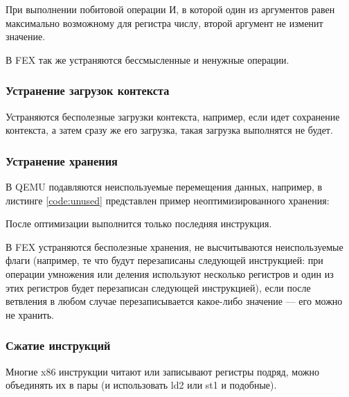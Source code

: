 При выполнении побитовой операции И, в которой один из аргументов равен максимально возможному для регистра числу, второй аргумент не изменит значение.

В FEX так же устраняются бессмысленные и ненужные операции.

\subsubsection{Устранение загрузок контекста}

Устраняются бесполезные загрузки контекста, например, если идет сохранение контекста, а затем сразу же его загрузка, такая загрузка выполнятся не будет. 

\subsubsection{Устранение хранения}

В QEMU подавляются неиспользуемые перемещения данных, например, в листинге \ref{code:unused} представлен пример неоптимизированного хранения:


После оптимизации выполнится только последняя инструкция.

В FEX устраняются бесполезные хранения, не высчитываются неиспользуемые флаги (например, те что будут перезаписаны следующей инструкцией: при операции умножения или деления используют несколько регистров и один из этих регистров будет перезаписан следующей инструкцией), если после ветвления в любом случае перезаписывается какое-либо значение --- его можно не хранить.

\subsubsection{Сжатие инструкций}

Многие x86 инструкции читают или записывают регистры подряд, можно объединять их в пары (и использовать ld2 или st1 и подобные).

